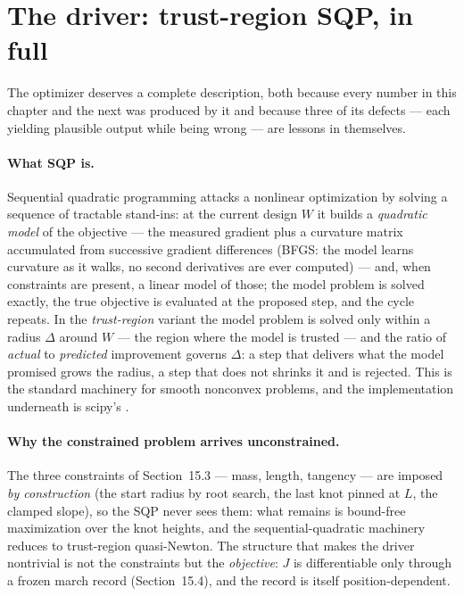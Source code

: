 \section{The driver: trust-region SQP, in full}
\label{sec:splinedriver}

The optimizer deserves a complete description, both because every
number in this chapter and the next was produced by it and because
three of its defects --- each yielding plausible output while being
wrong --- are lessons in themselves.

\paragraph{What SQP is.} Sequential quadratic programming attacks a
nonlinear optimization by solving a sequence of tractable stand-ins:
at the current design $W$ it builds a \emph{quadratic model} of the
objective --- the measured gradient plus a curvature matrix
accumulated from successive gradient differences (BFGS: the model
learns curvature as it walks, no second derivatives are ever
computed) --- and, when constraints are present, a linear model of
those; the model problem is solved exactly, the true objective is
evaluated at the proposed step, and the cycle repeats. In the
\emph{trust-region} variant the model problem is solved only within
a radius $\Delta$ around $W$ --- the region where the model is
trusted --- and the ratio of \emph{actual} to \emph{predicted}
improvement governs $\Delta$: a step that delivers what the model
promised grows the radius, a step that does not shrinks it and is
rejected. This is the standard machinery for smooth nonconvex
problems, and the implementation underneath is scipy's
.

\paragraph{Why the constrained problem arrives unconstrained.} The
three constraints of Section~15.3 --- mass, length, tangency ---
are imposed \emph{by construction} (the start radius by root
search, the last knot pinned at $L$, the clamped slope), so the SQP
never sees them: what remains is bound-free maximization over the
knot heights, and the sequential-quadratic machinery reduces to
trust-region quasi-Newton. The structure that makes the driver
nontrivial is not the constraints but the \emph{objective}: $J$ is
differentiable only through a frozen march record
(Section~15.4), and the record is itself position-dependent.


